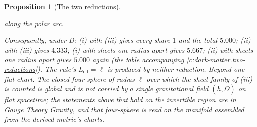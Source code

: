 \documentclass[11pt]{article}
\newtheorem{proposition}[theorem]{Proposition}
\theoremstyle{definition}
\theoremstyle{plain}
\providecommand{\hb}{}\renewcommand{\hb}{\bar{h}}
\begin{document}
\begin{proposition}[The two reductions]
\begin{enumerate}
\[\]
along the polar arc.
\end{enumerate}
Consequently, under D: (i) with (iii) gives every share $1$ and the total $5.000$; (ii) with (iii) gives $4.333$; (i) with sheets one radius apart gives $5.667$; (ii) with sheets one radius apart gives $5.000$ again (the table accompanying \ref{c:dark-matter.two-reductions}). The rule's $L_{\mathrm{eff}} = \ell$ is produced by neither reduction. \emph{Beyond one flat chart.} The closed four-sphere of radius $\ell$ over which the sheet family of (iii) is counted is global and is not carried by a single gravitational field $(\hb, \Omega)$ on flat spacetime; the statements above that hold on the invertible region are in Gauge Theory Gravity, and that four-sphere is read on the manifold assembled from the derived metric's charts.
\end{proposition}
\end{document}
